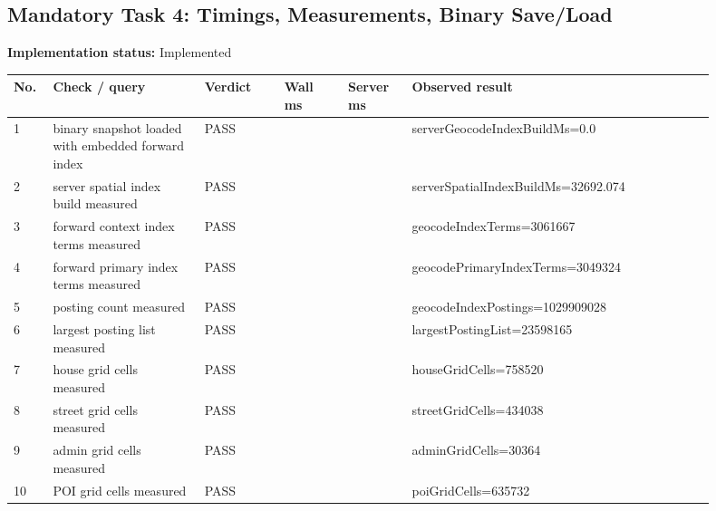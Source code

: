 \documentclass[10pt,a4paper]{article}
\begin{document}
\subsection{Mandatory Task 4: Timings, Measurements, Binary Save/Load}
\textbf{Implementation status:} Implemented\\
\scriptsize
\begin{longtable}{|P{0.045\linewidth}|P{0.19\linewidth}|P{0.105\linewidth}|P{0.085\linewidth}|P{0.085\linewidth}|P{0.385\linewidth}|}
\hline
\textbf{No.} & \textbf{Check / query} & \textbf{Verdict} & \textbf{Wall ms} & \textbf{Server ms} & \textbf{Observed result}\\ \hline
{} 1 & binary snapshot loaded with embedded forward index & PASS &  &  & serverGeocodeIndexBuildMs=0.0\\ \hline
{} 2 & server spatial index build measured & PASS &  &  & serverSpatialIndexBuildMs=32692.074\\ \hline
{} 3 & forward context index terms measured & PASS &  &  & geocodeIndexTerms=3061667\\ \hline
{} 4 & forward primary index terms measured & PASS &  &  & geocodePrimaryIndexTerms=3049324\\ \hline
{} 5 & posting count measured & PASS &  &  & geocodeIndexPostings=1029909028\\ \hline
{} 6 & largest posting list measured & PASS &  &  & largestPostingList=23598165\\ \hline
{} 7 & house grid cells measured & PASS &  &  & houseGridCells=758520\\ \hline
{} 8 & street grid cells measured & PASS &  &  & streetGridCells=434038\\ \hline
{} 9 & admin grid cells measured & PASS &  &  & adminGridCells=30364\\ \hline
{} 10 & POI grid cells measured & PASS &  &  & poiGridCells=635732\\ \hline
\end{longtable}
\normalsize
\end{document}
